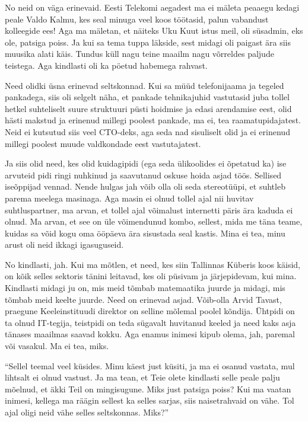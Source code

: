 No neid on väga erinevaid. Eesti Telekomi aegadest ma ei mäleta peaaegu kedagi 
peale Valdo Kalmu, kes seal minuga veel koos töötasid, 
palun vabandust kolleegide ees! Aga ma mäletan, et näiteks Uku 
Kuut istus meil, oli süsadmin, eks ole, patsiga poiss. Ja 
kui sa tema tuppa läkside, sest midagi oli paigast ära siis muusika alati käis. 
Tundus küll nagu teine maailm nagu võrreldes paljude teistega. Aga kindlasti 
oli ka pöetud habemega rahvast.  

Need olidki üsna erinevad seltskonnad. Kui sa müüd telefonijaama ja  tegeled 
pankadega, siis oli selgelt näha, et pankade tehnikajuhid vastutasid juba 
tollel hetkel suhteliselt suure struktuuri püsti hoidmise ja edasi arendamise 
eest, olid hästi makstud ja erinenud millegi poolest pankade, ma ei, tea 
raamatupidajatest. Neid ei kutsutud siis veel CTO-deks, aga seda nad sisuliselt 
olid ja ei erinenud millegi poolest muude valdkondade eest vastutajatest. 

Ja siis olid need, kes olid kuidagipidi (ega seda ülikoolides ei õpetatud ka) 
ise arvuteid pidi ringi nuhkinud ja saavutanud oskuse hoida asjad töös. 
Sellised iseõppijad vennad. Nende hulgas jah võib olla oli seda stereotüüpi, et 
suhtleb parema meelega masinaga. Aga masin ei olnud tollel ajal nii huvitav 
suhtluspartner, ma arvan, et tollel ajal võimalust internetti päris ära kaduda 
ei olnud. Ma arvan, et see on üle võimendunud kombo, sellest, mida me täna 
teame, kuidas sa võid kogu oma ööpäeva ära sisustada seal kastis. Mina ei tea, 
minu arust oli neid ikkagi igasuguseid.


No kindlasti, jah. Kui ma mõtlen, et need, kes siin Tallinnas 
Küberis koos käisid, on kõik selles sektoris tänini  leitavad, kes 
oli püsivam ja järjepidevam, kui mina. Kindlasti midagi ju on, mis meid tõmbab 
matemaatika juurde ja midagi, mis tõmbab meid keelte juurde. Need on erinevad 
asjad. Võib-olla Arvid Tavast, praegune 
Keeleinstituudi direktor on selline mõlemal poolel 
kõndija. Ühtpidi on ta olnud IT-tegija, teistpidi on teda sügavalt huvitanud 
keeled ja need kaks asja tänases maailmas saavad  kokku. Aga enamus inimesi 
kipub olema, jah, paremal või vasakul. Ma ei tea, miks.

\enquote{Sellel teemal veel küsides. Minu käest just küsiti, ja ma ei osanud 
vastata, mul lihtsalt ei olnud vastust. Ja ma tean, et Teie olete kindlasti 
selle peale palju mõelnud, et äkki Teil on mingisugune. Miks just patsiga 
poiss? Kui ma vaatan  inimesi, kellega ma räägin sellest ka selles sarjas, siis 
naisetrahvaid on vähe. Tol ajal oligi neid vähe selles seltskonnas. Miks?}\label{sisu:tydrukud}

